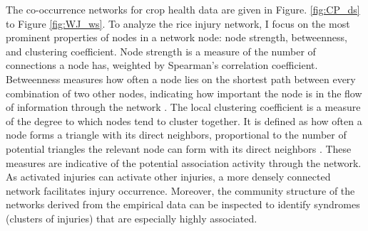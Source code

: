 The co-occurrence networks for crop health data are given in Figure. \ref{fig:CP_ds} to Figure \ref{fig:WJ_ws}. To analyze the rice injury network, I focus on the most prominent properties of nodes in a network node: node strength, betweenness, and clustering coefficient. Node strength is a measure of the number of connections a node has, weighted by Spearman’s correlation coefficient. Betweenness measures how often a node lies on the shortest path between every combination of two other nodes, indicating how important the node is in the flow of information through the network \citep{Opsahl_2010_Node}. The local clustering coefficient is a measure of the degree to which nodes tend to cluster together. It is defined as how often a node forms a triangle with its direct neighbors, proportional to the number of potential triangles the relevant node can form with its direct neighbors \citet{Opsahl_2010_Node}. These measures are indicative of the potential association activity through the network. As activated injuries can activate other injuries, a more densely connected network facilitates injury occurrence. Moreover, the community structure of the networks derived from the empirical data can be inspected to identify syndromes (clusters of injuries) that are especially highly associated.
%




